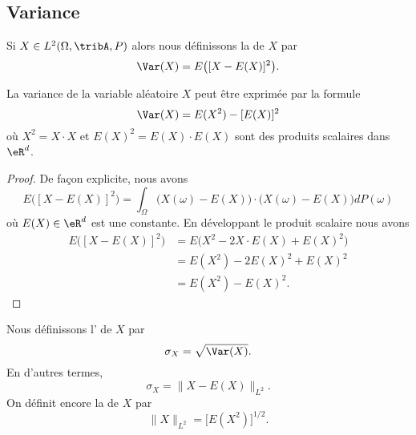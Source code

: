 \subsection{Variance}

Si \( X\in L^2(\Omega,\tribA,P)\) alors nous définissons la  de \( X\) par
\begin{equation}
    \Var(X)=E\big( [X-E(X)]^2 \big).
\end{equation}

\begin{proposition}     \label{PrropVarAlterfrom}
    La variance de la variable aléatoire \( X\) peut être exprimée par la formule
    \begin{equation}        \label{EqtWqMGB}
        \Var(X)=E(X^2)-[E(X)]^2
    \end{equation}
    où \( X^2=X\cdot X\) et \( E(X)^2=E(X)\cdot E(X)\) sont des produits scalaires dans \( \eR^d\).
\end{proposition}

\begin{proof}
    De façon explicite, nous avons
    \begin{equation}
        E\big( [X-E(X)]^2 \big)=\int_{\Omega}\big( X(\omega)-E(X) \big)\cdot\big( X(\omega)-E(X) \big)dP(\omega)
    \end{equation}
    où \( E(X)\in\eR^d\) est une constante. En développant le produit scalaire nous avons
    \begin{subequations}
        \begin{align}
            E\big( [X-E(X)]^2 \big)&=E\big( X^2-2X\cdot E(X)+E(X)^2 \big)\\
            &=E(X^2)-2E(X)^2+E(X)^2\\
            &=E(X^2)-E(X)^2.
        \end{align}
    \end{subequations}
\end{proof}


Nous définissons l' de \( X\) par
\begin{equation}
    \sigma_X=\sqrt{\Var(X)}.
\end{equation}
En d'autres termes,
\begin{equation}
    \sigma_X=\| X-E(X) \|_{L^2}.
\end{equation}
On définit encore la  de \( X\) par
\begin{equation}
    \| X \|_{L^2}=\big[ E(X^2) \big]^{1/2}.
\end{equation}

